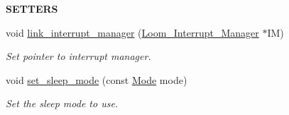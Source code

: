 \begin{Indent}{\bf S\+E\+T\+T\+E\+RS}\par
\begin{DoxyCompactItemize}
\item 
void \hyperlink{class_loom___sleep___manager_a8a6bdde2cff93469c558890273de231d}{link\+\_\+interrupt\+\_\+manager} (\hyperlink{class_loom___interrupt___manager}{Loom\+\_\+\+Interrupt\+\_\+\+Manager} $\ast$IM)
\begin{DoxyCompactList}\small\item\em Set pointer to interrupt manager. \end{DoxyCompactList}\item 
void \hyperlink{class_loom___sleep___manager_a684b78e0a86c3902fe66374d67c1024d}{set\+\_\+sleep\+\_\+mode} (const \hyperlink{class_loom___sleep___manager_ab1cb2baaf00c386048490c3787a2de13}{Mode} mode)
\begin{DoxyCompactList}\small\item\em Set the sleep mode to use. \end{DoxyCompactList}\end{DoxyCompactItemize}
\end{Indent}

